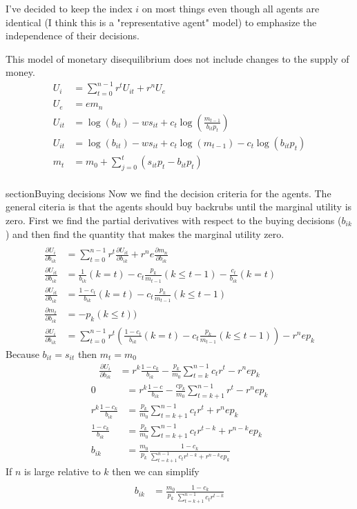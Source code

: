 \documentclass[14pt]{article} \usepackage{amsmath}
\begin{document}
I've decided to keep the index $i$ on most things even though all agents are identical (I think this is a "representative agent" model) to emphasize the independence of their decisions. 

This model of monetary disequilibrium does not include changes to the supply of money.  
\begin{align} 
	U_i &= \sum\limits_{t=0}^{n-1} r^t U_{it} + r^n U_e
	\\U_e &=  e m_n 
	\\U_{it} &= \log(b_{it}) - w s_{it} + c_t \log(\frac{m_{t-1}}{b_{it} p_t})
	\\ U_{it} &= \log(b_{it}) - w s_{it} + c_t \log(m_{t-1}) - c_t \log(b_{it} p_t)
	\\ m_t &= m_0 + \sum\limits_{j=0}^t (s_{it} p_t -b_{it} p_t)
\end{align}
\\section{Buying decisions}
Now we find the decision criteria for the agents. 
The general citeria is that the agents should buy backrubs until the marginal utility is zero.
First we find the partial derivatives with respect to the buying decisions ($b_{ik}$) and then find the quantity that makes the marginal utility zero.
\begin{align}
	\\\frac{ \partial U_i}{\partial b_{ik}} &= \sum\limits_{t=0}^{n-1} r^t \frac{\partial U_{it}}{\partial b_{ik}} + r^n e \frac{\partial m_n}{\partial b_{ik}} 
	\\\frac{\partial U_{it}}{\partial b_{ik}} &= \frac{1}{b_{ik}} (k = t)-c_t \frac{p_k}{m_{t-1}} (k \leq t-1) - \frac{c_t}{b_{ik}} (k = t) 
	\\\frac{\partial U_{it}}{\partial b_{ik}} &= \frac{1-c_t}{b_{ik}} (k = t)-c_t\frac{p_k}{m_{t-1}} (k \leq t-1) 
	\\\frac{\partial m_t}{\partial b_{ik}} &= -p_k(k \leq t)) 
	\\\frac{\partial U_i}{\partial b_{ik}} &= \sum\limits_{t=0}^{n-1} r^t(\frac{1-c_t}{b_{ik}} (k = t)-c_t\frac{p_k}{m_{t-1}} (k \leq t-1)) - r^n e p_k 
\end{align}
Because $b_{it} = s_{it}$ then $m_t = m_0$ 
\begin{align}
	\frac{\partial U_i}{\partial b_{ik}} &= r^k\frac{1-c_k}{b_{ik}} - \frac{p_k}{m_0} \sum\limits_{t=k}^{n-1} c_t r^t - r^n e p_k
\end{align}
\begin{align}
 	0 &= r^k\frac{1-c}{b_{ik}} - \frac{c p_k}{m_0} \sum\limits_{t=k+1}^{n-1} r^t - r^n e p_k 
 	\\r^k\frac{1-c_k}{b_{ik}} &=  \frac{p_k}{m_0} \sum\limits_{t=k+1}^{n-1} c_t r^t + r^n e p_k 
 	\\\frac{1-c_k}{b_{ik}} &=  \frac{p_k}{m_0} \sum\limits_{t=k+1}^{n-1} c_t r^{t-k} + r^{n-k} e p_k 
 	\\b_{ik} &=  \frac{m_0}{p_k} \frac {1-c_k}{\sum\limits_{t=k+1}^{n-1} c_t r^{t-k} + r^{n-k} e p_k} 
\end{align}
If $n$ is large relative to $k$ then we can simplify 
\begin{align}
 	\\b_{ik} &=  \frac{m_0}{p_k} \frac {1-c_k}{\sum\limits_{t=k+1}^{n-1} c_t r^{t-k}} 
\end{align}
\end{document}
